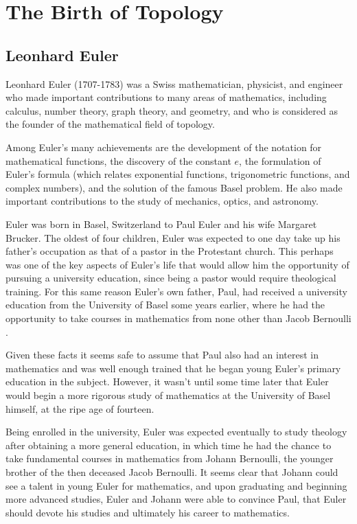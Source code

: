 \documentclass{IEEEcsmag}
\begin{document}
\section{The Birth of Topology}
  \subsection{Leonhard Euler}
    Leonhard Euler (1707-1783) \cite{boyer2023euler} was a Swiss mathematician, physicist, and engineer who 
    made important contributions to many areas of mathematics, including calculus, number theory, graph 
    theory, and geometry, and who is considered as the founder of the mathematical field of topology.

    Among Euler's many achievements are the development of the notation for mathematical functions, the 
    discovery of the constant $e$, the formulation of Euler's formula (which relates exponential functions, 
    trigonometric functions, and complex numbers), and the solution of the famous Basel problem. He also made 
    important contributions to the study of mechanics, optics, and astronomy.

    Euler was born in Basel, Switzerland to Paul Euler and his wife Margaret Brucker. The oldest of 
    four children, Euler was expected to one day take up his father's occupation as that of a pastor in 
    the Protestant church. This perhaps was one of the key aspects of Euler's life that would allow him the
    opportunity of pursuing a university education, since being a pastor would require theological training.
    For this same reason Euler's own father, Paul, had received a university education from the University of 
    Basel some years earlier, where he had the opportunity to take courses in mathematics from none other than 
    Jacob Bernoulli \cite{oconn1998euler}.
    
    Given these facts it seems safe to assume that Paul also had an interest in mathematics and was well enough 
    trained that he began young Euler's primary education in the subject. However, it wasn't until some time 
    later that Euler would begin a more rigorous study of mathematics at the University of Basel himself, at 
    the ripe age of fourteen.

    Being enrolled in the university, Euler was expected eventually to study theology after obtaining a more
    general education, in which time he had the chance to take fundamental courses in mathematics from 
    Johann Bernoulli, the younger brother of the then deceased Jacob Bernoulli. It seems clear that Johann
    could see a talent in young Euler for mathematics, and upon graduating and beginning more advanced studies,
    Euler and Johann were able to convince Paul, that Euler should devote his studies and ultimately his career
    to mathematics.
  
\end{document}
